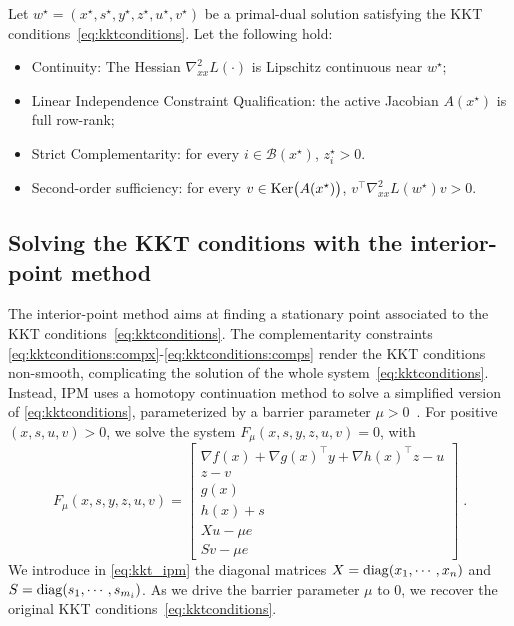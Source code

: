 \begin{assumption}
  \label{hyp:ipm}
  Let $w^\star = (x^\star, s^\star, y^\star, z^\star, u^\star, v^\star)$ be a primal-dual solution
  satisfying the KKT conditions~\eqref{eq:kktconditions}. Let the following hold:
  \begin{itemize}
  \item Continuity: The Hessian $\nabla^2_{x x} L(\cdot)$ is Lipschitz continuous
    near $w^\star$;
  \item Linear Independence Constraint Qualification: the active Jacobian $A(x^\star)$ is full row-rank;
  \item Strict Complementarity: for every $i \in \mathcal{B}(x^\star)$, $z_i^\star > 0$.
  \item Second-order sufficiency: for every $v \in \operatorname{Ker}\!\big(A(x^\star)\big)$,
    $v^\top \nabla_{x x}^2 L(w^\star)v > 0$.
  \end{itemize}
\end{assumption}


\subsection{Solving the KKT conditions with the interior-point method}
\label{sec:ipm:kkt}
The interior-point method aims at finding a stationary point
associated to the KKT conditions~\eqref{eq:kktconditions}.
The complementarity constraints \eqref{eq:kktconditions:compx}-\eqref{eq:kktconditions:comps}
render the KKT conditions non-smooth, complicating the solution of
the whole system~\eqref{eq:kktconditions}.
Instead, IPM uses a homotopy continuation method to solve a simplified
version of \eqref{eq:kktconditions}, parameterized by a barrier
parameter $\mu > 0$~\cite[Chapter 19]{nocedal_numerical_2006}.
For positive $(x, s, u, v) > 0$, we solve the system
$F_\mu(x, s, y, z, u, v) = 0$, with
\begin{equation}
  \label{eq:kkt_ipm}
  F_\mu(x, s, y, z, u, v) =
  \begin{bmatrix}
       \nabla f(x) + \nabla g(x)^\top y + \nabla h(x)^\top z - u  \\
       z - v  \\
       g(x)  \\
       h(x) + s  \\
       X u - \mu e  \\
       S v - \mu e
  \end{bmatrix}
   \; .
\end{equation}
We introduce in \eqref{eq:kkt_ipm} the diagonal matrices $X = \operatorname{diag}(x_1, \cdots, x_n)$
and $S = \operatorname{diag}(s_1, \cdots, s_{m_i})$.
As we drive the barrier parameter $\mu$ to $0$, we recover the original
KKT conditions~\eqref{eq:kktconditions}.

